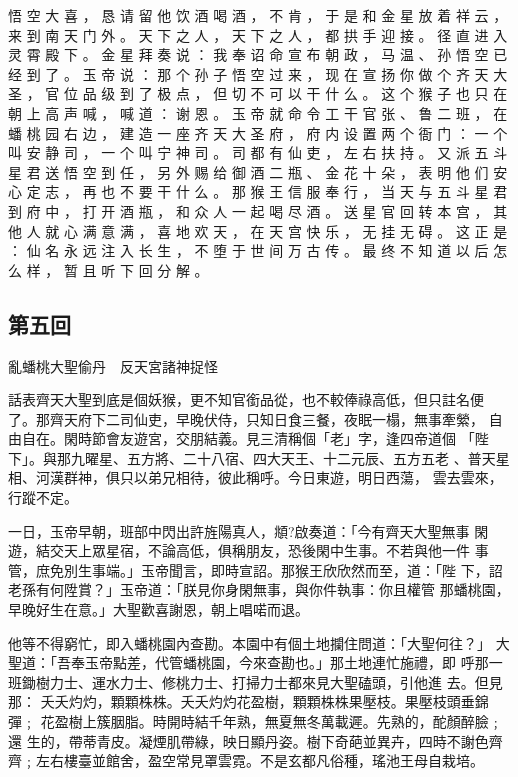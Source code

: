 {悟 空 大 喜 ， 恳 请 留 他 饮 酒 喝 酒 ， 不 肯 ， 于 是 和 金 星 放 着 祥 云 ， 来 到 南 天 门 外 。
天 下 之 人 ， 天 下 之 人 ， 都 拱 手 迎 接 。
径 直 进 入 灵 霄 殿 下 。
金 星 拜 奏 说 ： 我 奉 诏 命 宣 布 朝 政 ， 马 温 、 孙 悟 空 已 经 到 了 。
玉 帝 说 ： 那 个 孙 子 悟 空 过 来 ， 现 在 宣 扬 你 做 个 齐 天 大 圣 ， 官 位 品 级 到 了 极 点 ， 但 切 不 可 以 干 什 么 。
这 个 猴 子 也 只 在 朝 上 高 声 喊 ， 喊 道 ： 谢 恩 。
玉 帝 就 命 令 工 干 官 张 、 鲁 二 班 ， 在 蟠 桃 园 右 边 ， 建 造 一 座 齐 天 大 圣 府 ， 府 内 设 置 两 个 衙 门 ： 一 个 叫 安 静 司 ， 一 个 叫 宁 神 司 。
司 都 有 仙 吏 ， 左 右 扶 持 。
又 派 五 斗 星 君 送 悟 空 到 任 ， 另 外 赐 给 御 酒 二 瓶 、 金 花 十 朵 ， 表 明 他 们 安 心 定 志 ， 再 也 不 要 干 什 么 。
那 猴 王 信 服 奉 行 ， 当 天 与 五 斗 星 君 到 府 中 ， 打 开 酒 瓶 ， 和 众 人 一 起 喝 尽 酒 。
送 星 官 回 转 本 宫 ， 其 他 人 就 心 满 意 满 ， 喜 地 欢 天 ， 在 天 宫 快 乐 ， 无 挂 无 碍 。
这 正 是 ： 仙 名 永 远 注 入 长 生 ， 不 堕 于 世 间 万 古 传 。
最 终 不 知 道 以 后 怎 么 样 ， 暂 且 听 下 回 分 解 。
}\switchcolumn\flushpage  \begin{pinyinscope}{\myfontt \section{第五回}     亂蟠桃大聖偷丹　反天宮諸神捉怪

話表齊天大聖到底是個妖猴，更不知官銜品從，也不較俸祿高低，但只註名便
了。那齊天府下二司仙吏，早晚伏侍，只知日食三餐，夜眠一榻，無事牽縈，
自由自在。閑時節會友遊宮，交朋結義。見三清稱個「老」字，逢四帝道個
「陛下」。與那九曜星、五方將、二十八宿、四大天王、十二元辰、五方五老
、普天星相、河漢群神，俱只以弟兄相待，彼此稱呼。今日東遊，明日西蕩，
雲去雲來，行蹤不定。

一日，玉帝早朝，班部中閃出許旌陽真人，頫?啟奏道：「今有齊天大聖無事
閑遊，結交天上眾星宿，不論高低，俱稱朋友，恐後閑中生事。不若與他一件
事管，庶免別生事端。」玉帝聞言，即時宣詔。那猴王欣欣然而至，道：「陛
下，詔老孫有何陞賞？」玉帝道：「朕見你身閑無事，與你件執事：你且權管
那蟠桃園，早晚好生在意。」大聖歡喜謝恩，朝上唱喏而退。

他等不得窮忙，即入蟠桃園內查勘。本園中有個土地攔住問道：「大聖何往？」
大聖道：「吾奉玉帝點差，代管蟠桃園，今來查勘也。」那土地連忙施禮，即
呼那一班鋤樹力士、運水力士、修桃力士、打掃力士都來見大聖磕頭，引他進
去。但見那：
夭夭灼灼，顆顆株株。夭夭灼灼花盈樹，顆顆株株果壓枝。果壓枝頭垂錦彈﹔
花盈樹上簇胭脂。時開時結千年熟，無夏無冬萬載遲。先熟的，酡顏醉臉﹔還
生的，帶蒂青皮。凝煙肌帶綠，映日顯丹姿。樹下奇葩並異卉，四時不謝色齊
齊﹔左右樓臺並館舍，盈空常見罩雲霓。不是玄都凡俗種，瑤池王母自栽培。

}
\end{pinyinscope}
